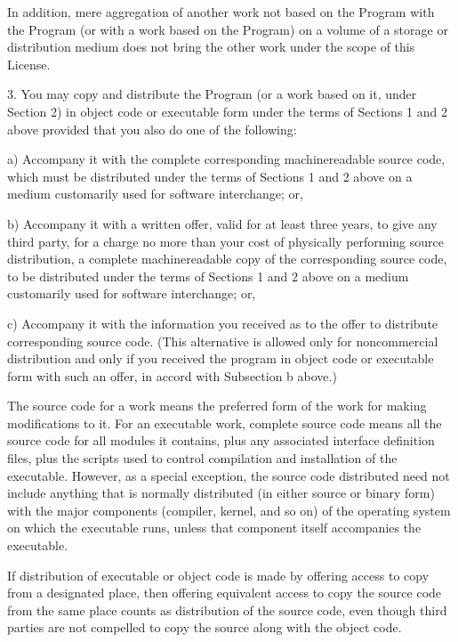 \documentclass[letterpaper,10pt,english,openany,oneside]{sphinxmanual}
\begin{document}
\begin{sphinxVerbatim}[commandchars=\\\{\}]
In addition, mere aggregation of another work not based on the Program
with the Program (or with a work based on the Program) on a volume of
a storage or distribution medium does not bring the other work under
the scope of this License.

  3. You may copy and distribute the Program (or a work based on it,
under Section 2) in object code or executable form under the terms of
Sections 1 and 2 above provided that you also do one of the following:

    a) Accompany it with the complete corresponding machine\PYGZhy{}readable
    source code, which must be distributed under the terms of Sections
    1 and 2 above on a medium customarily used for software interchange; or,

    b) Accompany it with a written offer, valid for at least three
    years, to give any third party, for a charge no more than your
    cost of physically performing source distribution, a complete
    machine\PYGZhy{}readable copy of the corresponding source code, to be
    distributed under the terms of Sections 1 and 2 above on a medium
    customarily used for software interchange; or,

    c) Accompany it with the information you received as to the offer
    to distribute corresponding source code.  (This alternative is
    allowed only for noncommercial distribution and only if you
    received the program in object code or executable form with such
    an offer, in accord with Subsection b above.)

The source code for a work means the preferred form of the work for
making modifications to it.  For an executable work, complete source
code means all the source code for all modules it contains, plus any
associated interface definition files, plus the scripts used to
control compilation and installation of the executable.  However, as a
special exception, the source code distributed need not include
anything that is normally distributed (in either source or binary
form) with the major components (compiler, kernel, and so on) of the
operating system on which the executable runs, unless that component
itself accompanies the executable.

If distribution of executable or object code is made by offering
access to copy from a designated place, then offering equivalent
access to copy the source code from the same place counts as
distribution of the source code, even though third parties are not
compelled to copy the source along with the object code.


\end{sphinxVerbatim}
\end{document}
